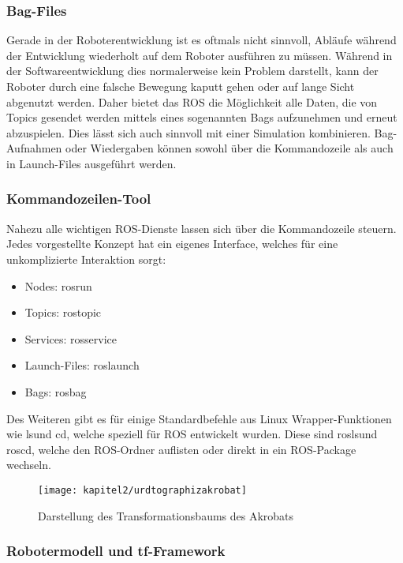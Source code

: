 \subsubsection{Bag-Files}

Gerade in der Roboterentwicklung ist es oftmals nicht sinnvoll, Abläufe während der Entwicklung wiederholt auf dem Roboter ausführen zu müssen. Während in der Softwareentwicklung dies normalerweise kein Problem darstellt, kann der Roboter durch eine falsche Bewegung kaputt gehen oder auf lange Sicht abgenutzt werden. Daher bietet das \ac{ROS} die Möglichkeit alle Daten, die von Topics gesendet werden mittels eines sogenannten Bags aufzunehmen und erneut abzuspielen. Dies lässt sich auch sinnvoll mit einer Simulation kombinieren. Bag-Aufnahmen oder Wiedergaben können sowohl über die Kommandozeile als auch in Launch-Files ausgeführt werden.

\subsubsection{Kommandozeilen-Tool}

Nahezu alle wichtigen \ac{ROS}-Dienste lassen sich über die Kommandozeile steuern. Jedes vorgestellte Konzept hat ein eigenes Interface, welches für eine unkomplizierte Interaktion sorgt:
\begin{itemize}
\item Nodes: rosrun
\item Topics: rostopic
\item Services: rosservice
\item Launch-Files: roslaunch
\item Bags: rosbag
\end{itemize}

Des Weiteren gibt es für einige Standardbefehle aus Linux Wrapper-Funktionen wie \glq ls\grq und \glq cd\grq, welche speziell für \ac{ROS} entwickelt wurden. Diese sind \glq rosls\grq und \glq roscd\grq, welche den \ac{ROS}-Ordner auflisten oder direkt in ein \ac{ROS}-Package wechseln.

\begin{figure}[t!]
  \centering
  \texttt{[image: kapitel2/urdtographizakrobat]}
  \caption{Darstellung des Transformationsbaums des Akrobats}
  \label{Kap2:urdtographizakrobat}
\end{figure}

\subsubsection{Robotermodell und tf-Framework}

